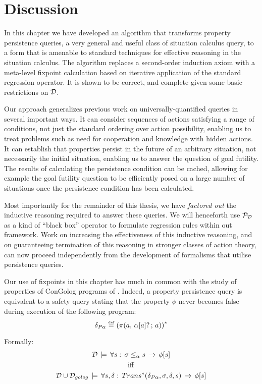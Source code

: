 \section{Discussion\label{sec:Persistence:Discussion}}

In this chapter we have developed an algorithm that transforms property
persistence queries, a very general and useful class of situation
calculus query, to a form that is amenable to standard techniques
for effective reasoning in the situation calculus. The algorithm replaces
a second-order induction axiom with a meta-level fixpoint calculation
based on iterative application of the standard regression operator.
It is shown to be correct, and complete given some basic restrictions
on $\mathcal{D}$.

Our approach generalizes previous work on universally-quantified queries
in several important ways. It can consider sequences of actions satisfying
a range of conditions, not just the standard ordering over action
possibility, enabling us to treat problems such as need for cooperation
and knowledge with hidden actions. It can establish that properties
persist in the future of an arbitrary situation, not necessarily the
initial situation, enabling us to answer the question of goal futility.
The results of calculating the persistence condition can be cached,
allowing for example the goal futility question to be efficiently
posed on a large number of situations once the persistence condition
has been calculated.

Most importantly for the remainder of this thesis, we have \emph{factored
out} the inductive reasoning required to answer these queries. We
will henceforth use $\mathcal{P}_{\mathcal{D}}$ as a kind of {}``black box'' operator
to formulate regression rules within out framework. Work on increasing
the effectiveness of this inductive reasoning, and on guaranteeing
termination of this reasoning in stronger classes of action theory,
can now proceed independently from the development of formalisms that
utilise persistence queries.

Our use of fixpoints in this chapter has much in common with the study
of properties of ConGolog programs of \citep{ternovska97congolog_fixpoint,classen08golog_properties}.
Indeed, a property persistence query is equivalent to a safety query
stating that the property $\phi$ never becomes false during execution
of the following program:\[
\delta_{P\alpha}\stackrel{\mbox{\tiny def}}{=}\left(\pi(a,\,\alpha[a]?\,;\, a)\right)^{*}\]


Formally:\begin{gather*}
\mathcal{D}\,\models\,\forall s:\,\sigma\leq_{\alpha}s\,\rightarrow\,\phi[s]\\
\mathrm{iff}\\
\mathcal{D}\cup\mathcal{D}_{golog}\,\models\,\forall s,\delta:\, Trans^{*}(\delta_{P\alpha},\sigma,\delta,s)\,\rightarrow\,\phi[s]\end{gather*}


